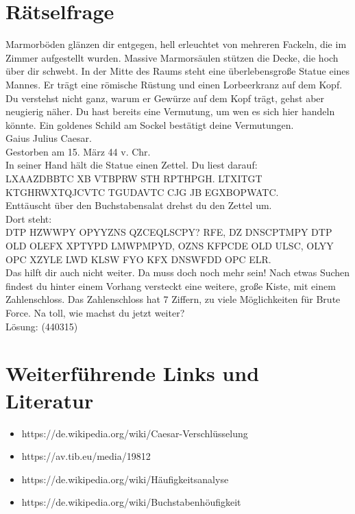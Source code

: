 \documentclass[12pt, letterpaper]{article}
\begin{document}
\section{Rätselfrage}

 Marmorböden glänzen dir entgegen, hell erleuchtet von mehreren Fackeln, die im Zimmer aufgestellt wurden.
 Massive Marmorsäulen stützen die Decke, die hoch über dir schwebt.
 In der Mitte des Raums steht eine überlebensgroße Statue eines Mannes.
 Er trägt eine römische Rüstung und einen Lorbeerkranz auf dem Kopf.
 Du verstehst nicht ganz, warum er Gewürze auf dem Kopf trägt, gehst aber neugierig näher.
 Du hast bereits eine Vermutung, um wen es sich hier handeln könnte.
 Ein goldenes Schild am Sockel bestätigt deine Vermutungen. \\

\noindent Gaius Julius Caesar. \\
Gestorben am 15. März 44 v. Chr. \\

\noindent In seiner Hand hält die Statue einen Zettel. Du liest darauf: \\

\noindent LXAAZDBBTC XB VTBPRW STH RPTHPGH. LTXITGT KTGHRWXTQJCVTC TGUDAVTC CJG JB EGXBOPWATC. \\

\noindent Enttäuscht über den Buchstabensalat drehst du den Zettel um. \\
Dort steht: \\

\noindent DTP HZWWPY OPYYZNS QZCEQLSCPY? RFE, DZ DNSCPTMPY DTP OLD OLEFX XPTYPD LMWPMPYD, OZNS KFPCDE OLD ULSC, OLYY OPC XZYLE LWD KLSW FYO KFX DNSWFDD OPC ELR. \\

\noindent Das hilft dir auch nicht weiter.
Da muss doch noch mehr sein!
Nach etwas Suchen findest du hinter einem Vorhang versteckt eine weitere, große Kiste, mit einem Zahlenschloss.
Das Zahlenschloss hat 7 Ziffern, zu viele Möglichkeiten für Brute Force.
Na toll, wie machst du jetzt weiter? \\

\noindent Lösung: (440315)

\section{Weiterführende Links und Literatur}

\begin{itemize}
	\item https://de.wikipedia.org/wiki/Caesar-Verschlüsselung
    \item https://av.tib.eu/media/19812
    \item https://de.wikipedia.org/wiki/Häufigkeitsanalyse
    \item https://de.wikipedia.org/wiki/Buchstabenhöufigkeit
\end{itemize}
\end{document}
